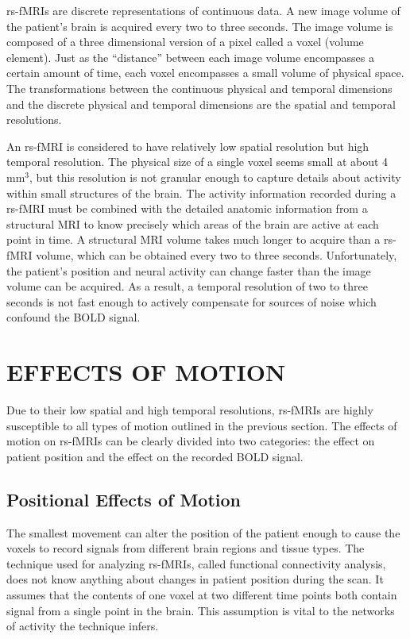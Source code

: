 rs-fMRIs are discrete representations of continuous data. A new image volume of the patient's brain is acquired every two to three seconds. The image volume is composed of a three dimensional version of a pixel called a voxel (volume element). Just as the ``distance'' between each image volume encompasses a certain amount of time, each voxel encompasses a small volume of physical space. The transformations between the continuous physical and temporal dimensions and the discrete physical and temporal dimensions are the spatial and temporal resolutions. 

An rs-fMRI is considered to have relatively low spatial resolution but high temporal resolution. The physical size of a single voxel seems small at about 4 mm$^3$, but this resolution is not granular enough to capture details about activity within small structures of the brain. The activity information recorded during a rs-fMRI must be combined with the detailed anatomic information from a structural MRI to know precisely which areas of the brain are active at each point in time. A structural MRI volume takes much longer to acquire than a rs-fMRI volume, which can be obtained every two to three seconds. Unfortunately, the patient's position and neural activity can change faster than the image volume can be acquired. As a result, a temporal resolution of two to three seconds is not fast enough to actively compensate for sources of noise which confound the BOLD signal. 

\section{EFFECTS OF MOTION}

Due to their low spatial and high temporal resolutions, rs-fMRIs are highly susceptible to all types of motion outlined in the previous section. The effects of motion on rs-fMRIs can be clearly divided into two categories: the effect on patient position and the effect on the recorded BOLD signal.

\subsection{Positional Effects of Motion}

The smallest movement can alter the position of the patient enough to cause the voxels to record signals from different brain regions and tissue types. The technique used for analyzing rs-fMRIs, called functional connectivity analysis, does not know anything about changes in patient position during the scan. It assumes that the contents of one voxel at two different time points both contain signal from a single point in the brain. This assumption is vital to the networks of activity the technique infers. 


